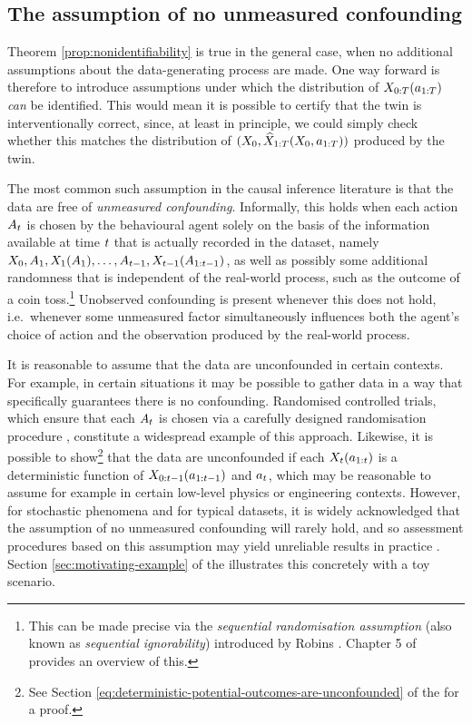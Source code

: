 \subsection{The assumption of no unmeasured confounding} \label{sec:no-unmeasured-confounding-assumption}

Theorem \ref{prop:nonidentifiability} is true in the general case, when no additional assumptions about the data-generating process are made.
One way forward is therefore to introduce assumptions under which the distribution of $X_{0:T}(a_{1:T})$ \emph{can} be identified.
This would mean it is possible to certify that the twin is interventionally correct, since, at least in principle, we could simply check whether this matches the distribution of $(X_0, \widehat{X}_{1:T}(X_{0}, a_{1:T}))$ produced by the twin.

The most common such assumption in the causal inference literature is that the data are free of \emph{unmeasured confounding}.
Informally, this holds when each action $A_t$ is chosen by the behavioural agent solely on the basis of the information available at time $t$ that is actually recorded in the dataset, namely $X_{0}, A_1, X_1(A_1), \ldots, A_{t-1}, X_{t-1}(A_{1:t-1})$, as well as possibly some additional randomness that is independent of the real-world process, such as the outcome of a coin toss.\footnote{This can be made precise via the \emph{sequential randomisation assumption} (also known as \emph{sequential ignorability}) introduced by Robins \cite{robins1986new}. Chapter 5 of \cite{tsiatis2019dynamic} provides an overview of this.}
%
Unobserved confounding is present whenever this does not hold, i.e.\ whenever some unmeasured factor simultaneously influences both the agent's choice of action and the observation produced by the real-world process.
%

It is reasonable to assume that the data are unconfounded in certain contexts.
For example, in certain situations it may be possible to gather data in a way that specifically guarantees there is no confounding.
Randomised controlled trials, which ensure that each $A_t$ is chosen via a carefully designed randomisation procedure \cite{lavori2004dynamic,murphy2005experimental}, constitute a widespread example of this approach.
Likewise, it is possible to show\footnote{See Section \ref{eq:deterministic-potential-outcomes-are-unconfounded} of the \AppendixName for a proof.} that the data are unconfounded if each $X_t(a_{1:t})$ is a deterministic function of $X_{0:t-1}(a_{1:t-1})$ and $a_{t}$, which may be reasonable to assume for example in certain low-level physics or engineering contexts.
However, for stochastic phenomena and for typical datasets, it is widely acknowledged that the assumption of no unmeasured confounding will rarely hold, and so assessment procedures based on this assumption may yield unreliable results in practice \cite{murphy2003optimal,tsiatis2019dynamic}.
Section \ref{sec:motivating-example} of the \AppendixName illustrates this concretely with a toy scenario.
%
%

